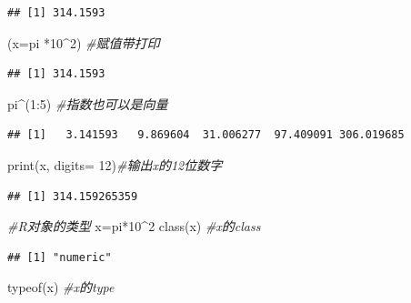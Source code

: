 \documentclass[
]{book}
\newenvironment{Shaded}{\begin{snugshade}}{\end{snugshade}}
\newcommand{\AttributeTok}[1]{\textcolor[rgb]{0.77,0.63,0.00}{#1}}
\newcommand{\CommentTok}[1]{\textcolor[rgb]{0.56,0.35,0.01}{\textit{#1}}}
\newcommand{\DecValTok}[1]{\textcolor[rgb]{0.00,0.00,0.81}{#1}}
\newcommand{\FunctionTok}[1]{\textcolor[rgb]{0.00,0.00,0.00}{#1}}
\newcommand{\NormalTok}[1]{#1}
\newcommand{\OtherTok}[1]{\textcolor[rgb]{0.56,0.35,0.01}{#1}}
\newcommand{\SpecialCharTok}[1]{\textcolor[rgb]{0.00,0.00,0.00}{#1}}
\begin{document}
\begin{verbatim}
## [1] 314.1593
\end{verbatim}

\begin{Shaded}
\begin{Highlighting}[]
\NormalTok{(}\AttributeTok{x=}\NormalTok{pi }\SpecialCharTok{*}\DecValTok{10}\SpecialCharTok{\^{}}\DecValTok{2}\NormalTok{) }\CommentTok{\#赋值带打印}
\end{Highlighting}
\end{Shaded}

\begin{verbatim}
## [1] 314.1593
\end{verbatim}

\begin{Shaded}
\begin{Highlighting}[]
\NormalTok{pi}\SpecialCharTok{\^{}}\NormalTok{(}\DecValTok{1}\SpecialCharTok{:}\DecValTok{5}\NormalTok{) }\CommentTok{\#指数也可以是向量}
\end{Highlighting}
\end{Shaded}

\begin{verbatim}
## [1]   3.141593   9.869604  31.006277  97.409091 306.019685
\end{verbatim}

\begin{Shaded}
\begin{Highlighting}[]
\FunctionTok{print}\NormalTok{(x, }\AttributeTok{digits=} \DecValTok{12}\NormalTok{)}\CommentTok{\#输出x的12位数字}
\end{Highlighting}
\end{Shaded}

\begin{verbatim}
## [1] 314.159265359
\end{verbatim}

\begin{Shaded}
\begin{Highlighting}[]
\CommentTok{\#R对象的类型}
\NormalTok{x}\OtherTok{=}\NormalTok{pi}\SpecialCharTok{*}\DecValTok{10}\SpecialCharTok{\^{}}\DecValTok{2}
\FunctionTok{class}\NormalTok{(x) }\CommentTok{\#x的class}
\end{Highlighting}
\end{Shaded}

\begin{verbatim}
## [1] "numeric"
\end{verbatim}

\begin{Shaded}
\begin{Highlighting}[]
\FunctionTok{typeof}\NormalTok{(x) }\CommentTok{\#x的type}
\end{Highlighting}
\end{Shaded}
\end{document}
